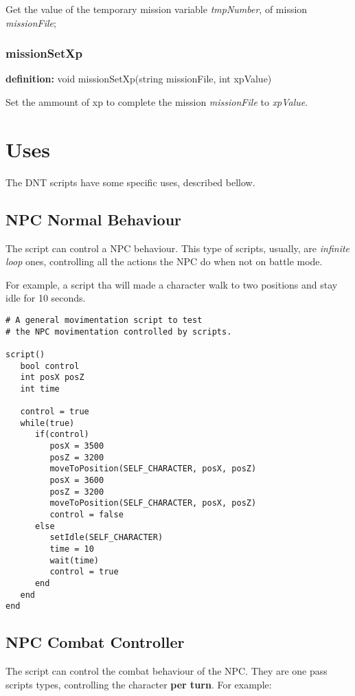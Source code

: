 \documentclass[ letterpaper,12pt]{article}
\begin{document}
Get the value of the temporary mission variable {\it tmpNumber}, of mission {\it
missionFile};

\subsubsection{missionSetXp}
{\bf definition:} void missionSetXp(string missionFile, int xpValue)

Set the ammount of xp to complete the mission {\it missionFile} to {\it
xpValue}.


\section{Uses}

The DNT scripts have some specific uses, described bellow.

\subsection{NPC Normal Behaviour}

The script can control a NPC behaviour. This type of scripts, usually, are
{\it infinite loop} ones, controlling all the actions the NPC do when not on
battle mode.

For example, a script tha will made a character walk to two positions and stay
idle for 10 seconds.

\begin{verbatim}
# A general movimentation script to test
# the NPC movimentation controlled by scripts.

script()
   bool control
   int posX posZ
   int time

   control = true
   while(true)
      if(control)
         posX = 3500
         posZ = 3200
         moveToPosition(SELF_CHARACTER, posX, posZ)
         posX = 3600
         posZ = 3200
         moveToPosition(SELF_CHARACTER, posX, posZ)
         control = false
      else
         setIdle(SELF_CHARACTER)
         time = 10
         wait(time)
         control = true
      end
   end
end
\end{verbatim}

\subsection{NPC Combat Controller}
The script can control the combat behaviour of the NPC. They are one pass
scripts types, controlling the character {\bf per turn}. For example:
\end{document}
